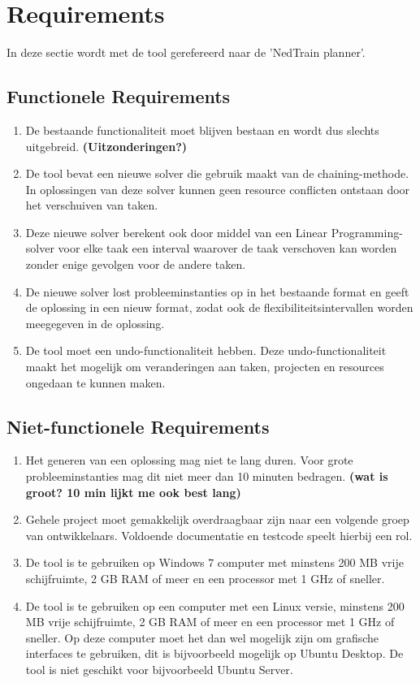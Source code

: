 \section{Requirements}
In deze sectie wordt met de tool gerefereerd naar de 'NedTrain planner'.

\subsection{Functionele Requirements}
\begin{enumerate}
    \item De bestaande functionaliteit moet blijven bestaan en wordt dus slechts uitgebreid. \textbf{(Uitzonderingen?)}
    \item De tool bevat een nieuwe solver die gebruik maakt van de chaining-methode. In oplossingen van deze solver kunnen geen resource conflicten ontstaan door het verschuiven van taken.
    \item Deze nieuwe solver berekent ook door middel van een Linear Programming-solver voor elke taak een interval waarover de taak verschoven kan worden zonder enige gevolgen voor de andere taken.
    \item De nieuwe solver lost probleeminstanties op in het bestaande format en geeft de oplossing in een nieuw format, zodat ook de flexibiliteitsintervallen worden meegegeven in de oplossing.
    \item De tool moet een undo-functionaliteit hebben. Deze undo-functionaliteit maakt het mogelijk om veranderingen aan taken, projecten en resources ongedaan te kunnen maken.
\end{enumerate}

\subsection{Niet-functionele Requirements}
\begin{enumerate}
    \item Het generen van een oplossing mag niet te lang duren. Voor grote probleeminstanties mag dit niet meer dan 10 minuten bedragen. \textbf{(wat is groot? 10 min lijkt me ook best lang)} 
    \item Gehele project moet gemakkelijk overdraagbaar zijn naar een volgende groep van ontwikkelaars. Voldoende documentatie en testcode speelt hierbij een rol.
    \item De tool is te gebruiken op Windows 7 computer met minstens 200 MB vrije schijfruimte, 2 GB RAM of meer en een processor met 1 GHz of sneller.
    \item De tool is te gebruiken op een computer met een Linux versie, minstens 200 MB vrije schijfruimte, 2 GB RAM of meer en een processor met 1 GHz of sneller. Op deze computer moet het dan wel mogelijk zijn om grafische interfaces te gebruiken, dit is bijvoorbeeld mogelijk op Ubuntu Desktop. De tool is niet geschikt voor bijvoorbeeld Ubuntu Server. 
\end{enumerate}
